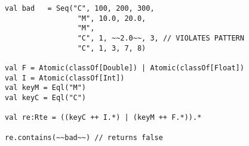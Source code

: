 \begin{lstlisting}[style=scalaioScala]
val bad   = Seq("C", 100, 200, 300,
                 "M", 10.0, 20.0,
                 "M",
                 "C", 1, ~~2.0~~, 3, // VIOLATES PATTERN
                 "C", 1, 3, 7, 8)

val F = Atomic(classOf[Double]) | Atomic(classOf[Float])
val I = Atomic(classOf[Int])
val keyM = Eql("M")
val keyC = Eql("C")

val re:Rte = ((keyC ++ I.*) | (keyM ++ F.*)).*

re.contains(~~bad~~) // returns false
\end{lstlisting}
